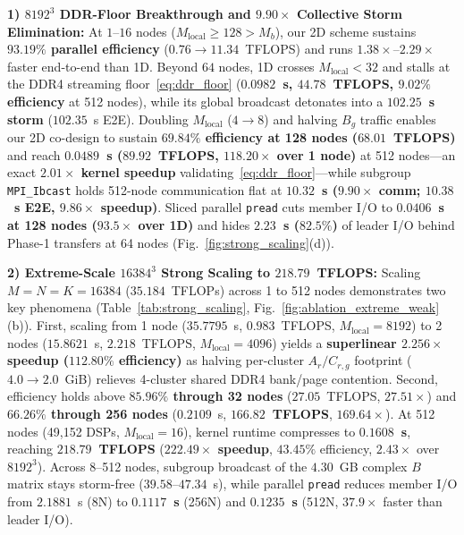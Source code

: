 \documentclass[journal]{IEEEtran}
\begin{document}
\textbf{1) $8192^3$ DDR-Floor Breakthrough and $9.90\times$ Collective Storm Elimination:} At $1$--$16$ nodes ($M_{\mathrm{local}} \ge 128 > M_b$), our 2D scheme sustains \textbf{$93.19\%$ parallel efficiency} ($0.76 \to 11.34$~TFLOPS) and runs $1.38\times$--$2.29\times$ faster end-to-end than 1D. Beyond $64$ nodes, 1D crosses $M_{\mathrm{local}} < 32$ and stalls at the DDR4 streaming floor~\eqref{eq:ddr_floor} (\textbf{$0.0982$~s, $44.78$~TFLOPS, $9.02\%$ efficiency} at 512 nodes), while its global broadcast detonates into a \textbf{$102.25$~s storm} ($102.35$~s E2E). Doubling $M_{\mathrm{local}}$ ($4 \to 8$) and halving $B_g$ traffic enables our 2D co-design to sustain \textbf{$69.84\%$ efficiency at 128 nodes ($68.01$~TFLOPS)} and reach \textbf{$0.0489$~s ($89.92$~TFLOPS, $118.20\times$ over 1 node)} at 512 nodes---an exact \textbf{$2.01\times$ kernel speedup} validating~\eqref{eq:ddr_floor}---while subgroup \texttt{MPI\_Ibcast} holds 512-node communication flat at \textbf{$10.32$~s ($9.90\times$ comm; $10.38$~s E2E, $9.86\times$ speedup)}. Sliced parallel \texttt{pread} cuts member I/O to \textbf{$0.0406$~s at 128 nodes ($93.5\times$ over 1D)} and hides \textbf{$2.23$~s ($82.5\%$)} of leader I/O behind Phase-1 transfers at 64 nodes (Fig.~\ref{fig:strong_scaling}(d)).

\textbf{2) Extreme-Scale $16384^3$ Strong Scaling to $218.79$~TFLOPS:} Scaling $M\!=\!N\!=\!K\!=\!16384$ ($35.184$~TFLOPs) across 1 to 512 nodes demonstrates two key phenomena (Table~\ref{tab:strong_scaling}, Fig.~\ref{fig:ablation_extreme_weak}(b)). First, scaling from 1 node ($35.7795$~s, $0.983$~TFLOPS, $M_{\mathrm{local}}\!=\!8192$) to 2 nodes ($15.8621$~s, $2.218$~TFLOPS, $M_{\mathrm{local}}\!=\!4096$) yields a \textbf{superlinear $2.256\times$ speedup ($112.80\%$ efficiency)} as halving per-cluster $A_r/C_{r,g}$ footprint ($4.0 \to 2.0$~GiB) relieves 4-cluster shared DDR4 bank/page contention. Second, efficiency holds above \textbf{$85.96\%$ through 32 nodes} ($27.05$~TFLOPS, $27.51\times$) and \textbf{$66.26\%$ through 256 nodes} ($0.2109$~s, \textbf{$166.82$~TFLOPS}, $169.64\times$). At 512 nodes (49,152 DSPs, $M_{\mathrm{local}}\!=\!16$), kernel runtime compresses to \textbf{$0.1608$~s}, reaching \textbf{$218.79$~TFLOPS} (\textbf{$222.49\times$ speedup}, $43.45\%$ efficiency, $2.43\times$ over $8192^3$). Across 8--512 nodes, subgroup broadcast of the $4.30$~GB complex $B$ matrix stays storm-free ($39.58$--$47.34$~s), while parallel \texttt{pread} reduces member I/O from $2.1881$~s (8N) to \textbf{$0.1117$~s} (256N) and \textbf{$0.1235$~s} (512N, $37.9\times$ faster than leader I/O).
\end{document}
